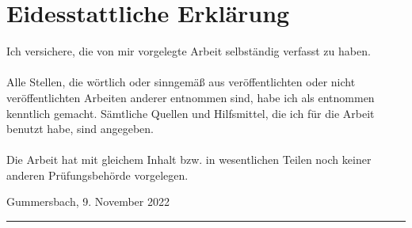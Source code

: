 
\chapter*{Eidesstattliche Erklärung}

\addchaptertocentry{\authorshipname} %

\noindent Ich versichere, die von mir vorgelegte Arbeit selbständig verfasst zu haben. \\ \\


\noindent Alle Stellen, die wörtlich oder sinngemäß aus veröffentlichten oder nicht veröffentlichten Arbeiten anderer entnommen sind, habe ich als entnommen kenntlich gemacht. Sämtliche Quellen und Hilfsmittel, die ich für die Arbeit benutzt habe, sind angegeben. \\ \\


\noindent Die Arbeit hat mit gleichem Inhalt bzw. in wesentlichen Teilen noch keiner anderen Prüfungsbehörde vorgelegen.

\vspace{1cm}  

\noindent Gummersbach, 9. November 2022  
 
 
\vspace{2.5cm} 
 

\noindent \rule[0.5em]{25em}{0.5pt} \\ %
\noindent \authorname
